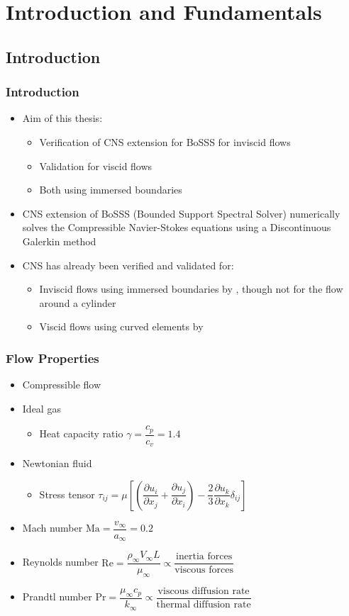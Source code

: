 \section{Introduction and Fundamentals}
\frame{\tableofcontents[currentsection]}
	\subsection{Introduction}
	\begin{frame}
		\frametitle{Introduction}
		\begin{itemize}
			\item Aim of this thesis:
		\begin{itemize}
			\item Verification of CNS extension for BoSSS for inviscid flows
			\item Validation for viscid flows
			\item Both using immersed boundaries
		\end{itemize}
		\item CNS extension of BoSSS (Bounded Support Spectral Solver) numerically solves the Compressible Navier-Stokes equations using a Discontinuous Galerkin method
		\item CNS has already been verified and validated for:
		\begin{itemize}
			\item Inviscid flows using immersed boundaries by \cite[Müller 2014]{muller2014}, though not for the flow around a cylinder
			\item Viscid flows using curved elements by \cite[Ayers 2015]{ayers2015}
		\end{itemize}
		\end{itemize}
	\end{frame}
	\begin{frame}
		\frametitle{Flow Properties}
		\begin{itemize}
			\item Compressible flow
			\item Ideal gas 
			\begin{itemize}
				\item Heat capacity ratio $\gamma = \dfrac{c_p}{c_v} = 1.4$
			\end{itemize}
			\item Newtonian fluid
			\begin{itemize}
				\item Stress tensor $\tau_{ij} = \mu \left[\left(\dfrac{\partial u_i}{\partial x_j} + \dfrac{\partial u_j}{\partial x_i}\right)- \dfrac{2}{3}\dfrac{\partial u_k}{\partial x_k} \delta_{ij}\right]$
			\end{itemize}
			\item Mach number $\text{Ma} = \dfrac{v_\infty}{a_\infty} = 0.2$
			\item Reynolds number $\text{Re} = \dfrac{\rho_\infty V_\infty L}{\mu_\infty} \propto \dfrac{\text{inertia forces}}{\text{viscous forces}}$
			\item Prandtl number $\text{Pr} = \dfrac{ \mu_\infty c_p}{k_\infty} \propto \dfrac{\text{viscous diffusion rate}}{\text{thermal diffusion rate}}$
		\end{itemize}
	\end{frame}
